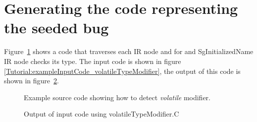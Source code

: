 \section{Generating the code representing the seeded bug}

    Figure~\ref{Tutorial:example_volatileTypeModifier}
shows a code that traverses each IR node and for and
SgInitializedName IR node checks its type.
The input code is shown in figure \ref{Tutorial:exampleInputCode_volatileTypeModifier},
the output of this code is shown in 
figure~\ref{Tutorial:exampleOutput_volatileTypeModifier}.


\begin{figure}[!h]
{\indent
{
\mySmallestFontSize

\begin{latexonly}
   
\end{latexonly}

\begin{htmlonly}
   
\end{htmlonly}

}
}
\caption{Example source code showing how to detect {\em volatile} modifier. }
\label{Tutorial:example_volatileTypeModifier}
\end{figure}


\begin{figure}[!h]
{\indent
{\mySmallFontSize

\begin{latexonly}
   
\end{latexonly}

\begin{htmlonly}
   
\end{htmlonly}

}
}
\caption{Output of input code using volatileTypeModifier.C}
\label{Tutorial:exampleOutput_volatileTypeModifier}
\end{figure}

